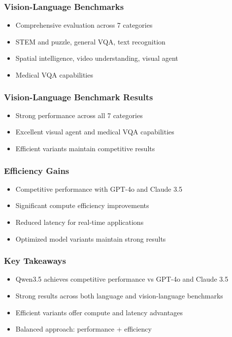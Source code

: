 \begin{frame}

\frametitle{Vision-Language Benchmarks}

\begin{itemize}
\item Comprehensive evaluation across 7 categories
\item STEM and puzzle, general VQA, text recognition
\item Spatial intelligence, video understanding, visual agent
\item Medical VQA capabilities
\end{itemize}
\end{frame}%
\begin{frame}

\frametitle{Vision-Language Benchmark Results}

\begin{itemize}
\item Strong performance across all 7 categories
\item Excellent visual agent and medical VQA capabilities
\item Efficient variants maintain competitive results
\end{itemize}
\end{frame}%
\begin{frame}

\frametitle{Efficiency Gains}

\begin{itemize}
\item Competitive performance with GPT-4o and Claude 3.5
\item Significant compute efficiency improvements
\item Reduced latency for real-time applications
\item Optimized model variants maintain strong results
\end{itemize}
\end{frame}%
\begin{frame}

\frametitle{Key Takeaways}

\begin{itemize}
\item Qwen3.5 achieves competitive performance vs GPT-4o and Claude 3.5
\item Strong results across both language and vision-language benchmarks
\item Efficient variants offer compute and latency advantages
\item Balanced approach: performance + efficiency
\end{itemize}
\end{frame}%

